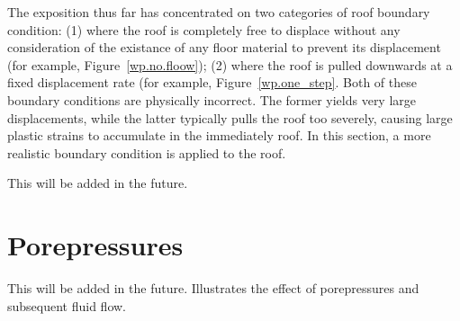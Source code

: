 \documentclass[]{scrreprt}
\begin{document}
The exposition thus far has concentrated on two categories of roof
boundary condition: (1) where the roof is completely free to displace
without any consideration of the existance of any floor material to
prevent its displacement (for example, Figure~\ref{wp.no.floow}); (2)
where the roof is pulled downwards at a fixed displacement rate (for
example, Figure~\ref{wp.one_step}.  Both of these boundary conditions
are physically incorrect.  The former yields very large
displacements, while the latter typically pulls the roof too severely,
causing large plastic strains to accumulate in the immediately roof.
In this section, a more realistic boundary condition is applied to the
roof.

This will be added in the future.




\chapter{Porepressures}

This will be added in the future.  Illustrates the effect of
porepressures and subsequent fluid flow.
\end{document}

